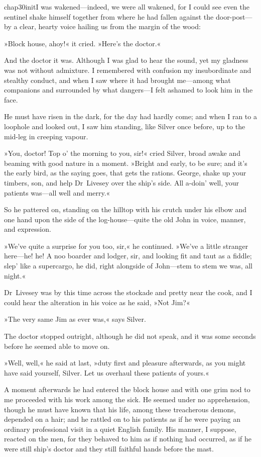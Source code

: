 
\lettrine[lines=5,image=true,findent=2pt]{chap30initI}{} was wakened—indeed, we were all wakened, for I could see even the sentinel shake himself together from where he had fallen against the door-post—by a clear, hearty voice hailing us from the margin of the wood:

»Block house, ahoy!« it cried. »Here's the doctor.«

And the doctor it was. Although I was glad to hear the sound, yet my gladness was not without admixture. I remembered with confusion my insubordinate and stealthy conduct, and when I saw where it had brought me—among what companions and surrounded by what dangers—I felt ashamed to look him in the face.

He must have risen in the dark, for the day had hardly come; and when I ran to a loophole and looked out, I saw him standing, like Silver once before, up to the mid-leg in creeping vapour.

»You, doctor! Top o' the morning to you, sir!« cried Silver, broad awake and beaming with good nature in a moment. »Bright and early, to be sure; and it's the early bird, as the saying goes, that gets the rations. George, shake up your timbers, son, and help Dr~Livesey over the ship's side. All a-doin' well, your patients was—all well and merry.«

So he pattered on, standing on the hilltop with his crutch under his elbow and one hand upon the side of the log-house—quite the old John in voice, manner, and expression.

»We've quite a surprise for you too, sir,« he continued. »We've a little stranger here—he! he! A noo boarder and lodger, sir, and looking fit and taut as a fiddle; slep' like a supercargo, he did, right alongside of John—stem to stem we was, all night.«

Dr~Livesey was by this time across the stockade and pretty near the cook, and I could hear the alteration in his voice as he said, »Not Jim?«

»The very same Jim as ever was,« says Silver.

The doctor stopped outright, although he did not speak, and it was some seconds before he seemed able to move on.

»Well, well,« he said at last, »duty first and pleasure afterwards, as you might have said yourself, Silver. Let us overhaul these patients of yours.«

A moment afterwards he had entered the block house and with one grim nod to me proceeded with his work among the sick. He seemed under no apprehension, though he must have known that his life, among these treacherous demons, depended on a hair; and he rattled on to his patients as if he were paying an ordinary professional visit in a quiet English family. His manner, I suppose, reacted on the men, for they behaved to him as if nothing had occurred, as if he were still ship's doctor and they still faithful hands before the mast.

